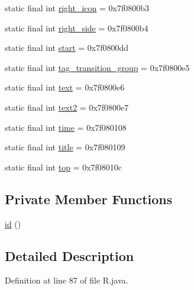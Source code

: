 \begin{DoxyCompactItemize}
\item 
static final int \mbox{\hyperlink{classandroid_1_1support_1_1coreui_1_1_r_1_1id_adec1f27bc9e7d34452d3501276ec7912}{right\+\_\+icon}} = 0x7f0800b3
\item 
static final int \mbox{\hyperlink{classandroid_1_1support_1_1coreui_1_1_r_1_1id_a6292c029de3781e6dc01ec51cc5bd947}{right\+\_\+side}} = 0x7f0800b4
\item 
static final int \mbox{\hyperlink{classandroid_1_1support_1_1coreui_1_1_r_1_1id_a768a6be3fe470d2ceb1edf0168144018}{start}} = 0x7f0800dd
\item 
static final int \mbox{\hyperlink{classandroid_1_1support_1_1coreui_1_1_r_1_1id_ad812ff5fab71caccfc5a915eae5634c6}{tag\+\_\+transition\+\_\+group}} = 0x7f0800e5
\item 
static final int \mbox{\hyperlink{classandroid_1_1support_1_1coreui_1_1_r_1_1id_a70077b33c7b9efaa4043b9e75e76b1f7}{text}} = 0x7f0800e6
\item 
static final int \mbox{\hyperlink{classandroid_1_1support_1_1coreui_1_1_r_1_1id_a378fd0235468c7c933faa797d45f4686}{text2}} = 0x7f0800e7
\item 
static final int \mbox{\hyperlink{classandroid_1_1support_1_1coreui_1_1_r_1_1id_a4f5b3260ffc6ddd8ea52933e4e4b18c7}{time}} = 0x7f080108
\item 
static final int \mbox{\hyperlink{classandroid_1_1support_1_1coreui_1_1_r_1_1id_acd9ab7fdae28f0ae11ffbf38849039fa}{title}} = 0x7f080109
\item 
static final int \mbox{\hyperlink{classandroid_1_1support_1_1coreui_1_1_r_1_1id_ad51af01ed4af4016a2cfc10b83f10eff}{top}} = 0x7f08010c
\end{DoxyCompactItemize}
\subsection*{Private Member Functions}
\begin{DoxyCompactItemize}
\item 
\mbox{\hyperlink{classandroid_1_1support_1_1coreui_1_1_r_1_1id_a482fad231e523dd911633f9f674fdf48}{id}} ()
\end{DoxyCompactItemize}


\subsection{Detailed Description}


Definition at line 87 of file R.\+java.




